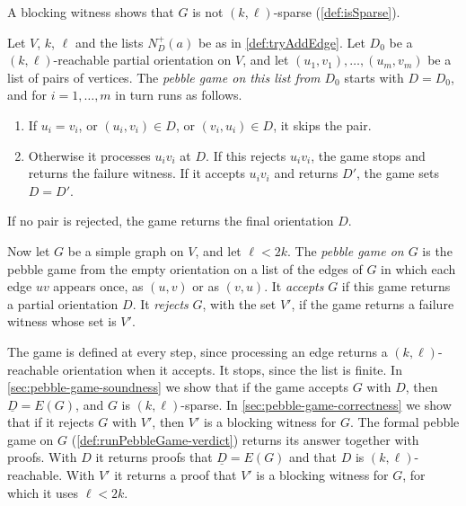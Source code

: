 A blocking witness shows that $G$ is not $(k, \ell)$-sparse
(\cref{def:isSparse}).

\begin{definition}
  \label{def:runPebbleGame}
  \leanok
  Let $V$, $k$, $\ell$ and the lists $N^+_D(a)$ be as in
  \cref{def:tryAddEdge}. Let $D_0$ be a $(k, \ell)$-reachable partial
  orientation on $V$, and let $(u_1, v_1), \ldots, (u_m, v_m)$ be a
  list of pairs of vertices. The \emph{pebble game on this list from
  $D_0$} starts with $D = D_0$, and for $i = 1, \ldots, m$ in turn
  runs as follows.
  \begin{enumerate}
    \item If $u_i = v_i$, or $(u_i, v_i) \in D$, or
      $(v_i, u_i) \in D$, it skips the pair.
    \item Otherwise it processes $u_i v_i$ at $D$. If this rejects
      $u_i v_i$, the game stops and returns the failure witness. If it
      accepts $u_i v_i$ and returns $D'$, the game sets $D = D'$.
  \end{enumerate}
  If no pair is rejected, the game returns the final orientation $D$.

  Now let $G$ be a simple graph on $V$, and let $\ell < 2k$. The
  \emph{pebble game on $G$} is the pebble game from the empty
  orientation on a list of the edges of $G$ in which each edge $uv$
  appears once, as $(u, v)$ or as $(v, u)$. It \emph{accepts} $G$ if
  this game returns a partial orientation $D$. It \emph{rejects} $G$,
  with the set $V'$, if the game returns a failure witness whose set is
  $V'$.
\end{definition}

The game is defined at every step, since processing an edge returns a
$(k, \ell)$-reachable orientation when it accepts. It stops, since the
list is finite. In \cref{sec:pebble-game-soundness} we show that if the
game accepts $G$ with $D$, then $\underline{D} = E(G)$, and $G$ is
$(k, \ell)$-sparse. In \cref{sec:pebble-game-correctness} we show that
if it rejects $G$ with $V'$, then $V'$ is a blocking witness for $G$.
The formal pebble game on $G$ (\cref{def:runPebbleGame-verdict})
returns its answer together with proofs. With $D$ it returns proofs that
$\underline{D} = E(G)$ and that $D$ is $(k, \ell)$-reachable. With
$V'$ it returns a proof that $V'$ is a blocking witness for $G$, for
which it uses $\ell < 2k$.

